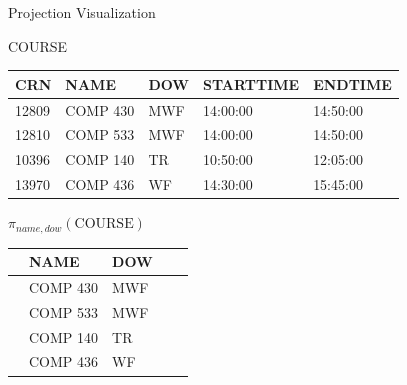 \documentclass[aspectratio=169]{beamer}
\begin{document}
\begin{frame}{Projection Visualization}

COURSE\\
\begin{tabular}{|p{1.5cm}|l|l|p{2cm}|p{2cm}|}  \hline
\textrm{CRN} & \textrm{NAME} & \textrm{DOW}& \textrm{STARTTIME}& \textrm{ENDTIME}\\ \hline
 12809 & COMP 430 & MWF & 14:00:00 & 14:50:00 \\ \hline
 12810 & COMP 533 & MWF & 14:00:00 & 14:50:00 \\ \hline
 10396 & COMP 140 & TR & 10:50:00 & 12:05:00 \\ \hline
 13970 & COMP 436 & WF & 14:30:00 & 15:45:00 \\ \hline
\end{tabular}

\vspace{1em}
$\pi_{name, dow}(\textrm{COURSE})$
\vspace{1em}

\begin{tabular}{|p{1.5cm}|l|l|p{2cm}|p{2cm}|}  \hline
\cellcolor{black} & \textrm{NAME} & \textrm{DOW}& \cellcolor{black}&\cellcolor{black}\\ \hline
\cellcolor{black}  & COMP 430 & MWF & \cellcolor{black} & \cellcolor{black} \\ \hline
 \cellcolor{black} & COMP 533 & MWF & \cellcolor{black} &\cellcolor{black} \\ \hline
 \cellcolor{black} & COMP 140 & TR & \cellcolor{black} & \cellcolor{black} \\ \hline
 \cellcolor{black} & COMP 436 & WF & \cellcolor{black} & \cellcolor{black} \\ \hline
\end{tabular}


\end{frame}
\end{document}

